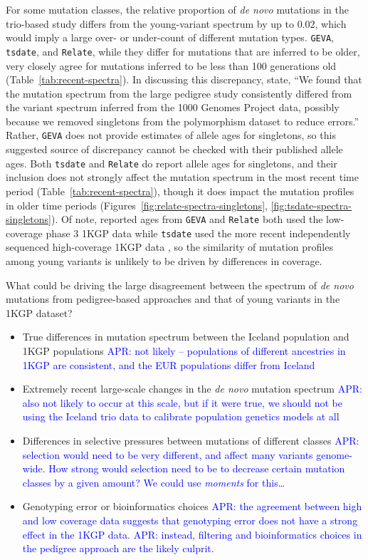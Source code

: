\documentclass[]{article}
\newcommand{\aprcomment}[1]{{\textcolor{blue}{APR: #1}}}
\newcommand{\GEVA}{\texttt{GEVA}\xspace}
\newcommand{\tsdate}{\texttt{tsdate}\xspace}
\newcommand{\relate}{\texttt{Relate}\xspace}
\begin{document}
For some mutation classes, the relative proportion of \emph{de novo} mutations
in the trio-based study differs from the young-variant spectrum by up to
$0.02$, which would imply a large over- or under-count of different mutation
types. \GEVA, \tsdate, and \relate, while they differ for mutations that are
inferred to be older, very closely agree for mutations inferred to be less than
100 generations old (Table~\ref{tab:recent-spectra}). In discussing this
discrepancy, \citet{wang2023human} state, ``We found that the mutation spectrum
from the large pedigree study consistently differed from the variant spectrum
inferred from the 1000 Genomes Project data, possibly because we removed
singletons from the polymorphism dataset to reduce errors.'' Rather, \GEVA does
not provide estimates of allele ages for singletons, so this suggested source
of discrepancy cannot be checked with their published allele ages. Both \tsdate
and \relate do report allele ages for singletons, and their inclusion does not
strongly affect the mutation spectrum in the most recent time period
(Table~\ref{tab:recent-spectra}), though it does impact the mutation profiles
in older time periods (Figures~\ref{fig:relate-spectra-singletons},
\ref{fig:tsdate-spectra-singletons}). Of note, reported ages from \GEVA and
\relate both used the low-coverage phase 3 1KGP data while \tsdate used the
more recent independently sequenced high-coverage 1KGP data
\citep{byrska2022high}, so the similarity of mutation profiles among young
variants is unlikely to be driven by differences in coverage.

What could be driving the large disagreement between the spectrum of \emph{de
novo} mutations from pedigree-based approaches and that of young variants in
the 1KGP dataset?
\begin{itemize}
    \item True differences in mutation spectrum between the Iceland population
        and 1KGP populations \aprcomment{not likely -- populations of different
        ancestries in 1KGP are consistent, and the EUR populations differ from
        Iceland}
    \item Extremely recent large-scale changes in the \emph{de novo} mutation
        spectrum \aprcomment{also not likely to occur at this scale, but if it
        were true, we should not be using the Iceland trio data to calibrate
        population genetics models at all}
    \item Differences in selective pressures between mutations of different
        classes \aprcomment{selection would need to be very different, and
        affect many variants genome-wide. How strong would selection need
        to be to decrease certain mutation classes by a given amount? We could
        use \emph{moments} for this\ldots}
    \item Genotyping error or bioinformatics choices \aprcomment{the agreement
        between high and low coverage data suggests that genotyping error does
        not have a strong effect in the 1KGP data.} \aprcomment{instead, filtering
        and bioinformatics choices in the pedigree approach are the likely
    culprit.} \citep{bergeron2022mutationathon}

\end{itemize}
\end{document}
